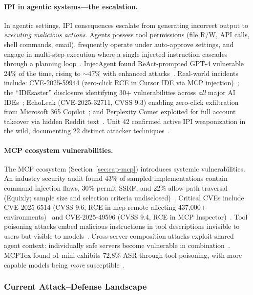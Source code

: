 \paragraph{IPI in agentic systems---the escalation.}
In agentic settings, IPI consequences escalate from generating incorrect output to \emph{executing malicious actions}. Agents possess tool permissions (file R/W, API calls, shell commands, email), frequently operate under auto-approve settings, and engage in multi-step execution where a single injected instruction cascades through a planning loop~\cite{schneider2025promptware}. InjecAgent found ReAct-prompted GPT-4 vulnerable 24\% of the time, rising to $\sim$47\% with enhanced attacks~\cite{zhan2024injecagent}. Real-world incidents include: CVE-2025-59944 (zero-click RCE in Cursor IDE via MCP injection)~\cite{lakera2025cursor}; the ``IDEsaster'' disclosure identifying 30+ vulnerabilities across \emph{all} major AI IDEs~\cite{idesaster2025}; EchoLeak (CVE-2025-32711, CVSS 9.3) enabling zero-click exfiltration from Microsoft 365 Copilot~\cite{echoleak2025}; and Perplexity Comet exploited for full account takeover via hidden Reddit text~\cite{brave2025comet}. Unit 42 confirmed active IPI weaponization in the wild, documenting 22 distinct attacker techniques~\cite{unit42ipi2026}.

\paragraph{MCP ecosystem vulnerabilities.}
The MCP ecosystem (Section~\ref{sec:cap-mcp}) introduces systemic vulnerabilities. An industry security audit found 43\% of sampled implementations contain command injection flaws, 30\% permit SSRF, and 22\% allow path traversal (Equixly; sample size and selection criteria undisclosed)~\cite{equixly2025mcp}. Critical CVEs include CVE-2025-6514 (CVSS 9.6, RCE in mcp-remote affecting 437,000+ environments)~\cite{jfrog2025mcpremote} and CVE-2025-49596 (CVSS 9.4, RCE in MCP Inspector)~\cite{oligo2025inspector}. Tool poisoning attacks embed malicious instructions in tool descriptions invisible to users but visible to models~\cite{invariant2025toolpoisoning}. Cross-server composition attacks exploit shared agent context: individually safe servers become vulnerable in combination~\cite{invariant2025whatsapp,croce2025trivial}. MCPTox found o1-mini exhibits 72.8\% ASR through tool poisoning, with more capable models being \emph{more} susceptible~\cite{wang2025mcptox}.


\subsubsection{Current Attack--Defense Landscape}
\label{sec:threat-landscape}

